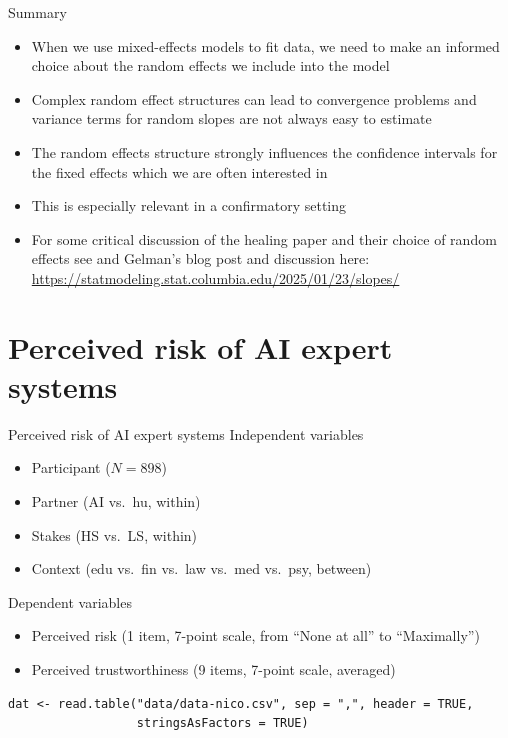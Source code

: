\documentclass[aspectratio=169]{beamer}
\begin{document}
\begin{frame}[<+->]{Summary}
  \begin{itemize}
    \item When we use mixed-effects models to fit data, we need to make an
      informed choice about the random effects we include into the model
    \item Complex random effect structures can lead to convergence problems and
      variance terms for random slopes are not always easy to estimate
    \item The random effects structure strongly influences the confidence
      intervals for the fixed effects which we are often interested in
    \item This is especially relevant in a confirmatory setting
    \item For some critical discussion of the healing paper and their choice of
      random effects see \citet{Gelman2024} and Gelman's blog post and
      discussion here:
      \url{https://statmodeling.stat.columbia.edu/2025/01/23/slopes/}
  \end{itemize}
\end{frame}

\section[AIES]{Perceived risk of AI expert systems}

\begin{frame}[fragile]{Perceived risk of AI expert systems}
  Independent variables
  \begin{itemize}
    \item Participant ($N = 898$)
    \item Partner (AI vs.\ hu, within)
    \item Stakes (HS vs.\ LS, within)
    \item Context (edu vs.\ fin vs.\ law vs.\ med vs.\ psy, between)
  \end{itemize}
  Dependent variables
  \begin{itemize}
    \item Perceived risk (1 item, 7-point scale, from ``None at all'' to
      ``Maximally'')
    \item Perceived trustworthiness (9 items, 7-point scale, averaged)
  \end{itemize}
  \begin{lstlisting}
dat <- read.table("data/data-nico.csv", sep = ",", header = TRUE,
                  stringsAsFactors = TRUE)
  \end{lstlisting}
\end{frame}
\end{document}

